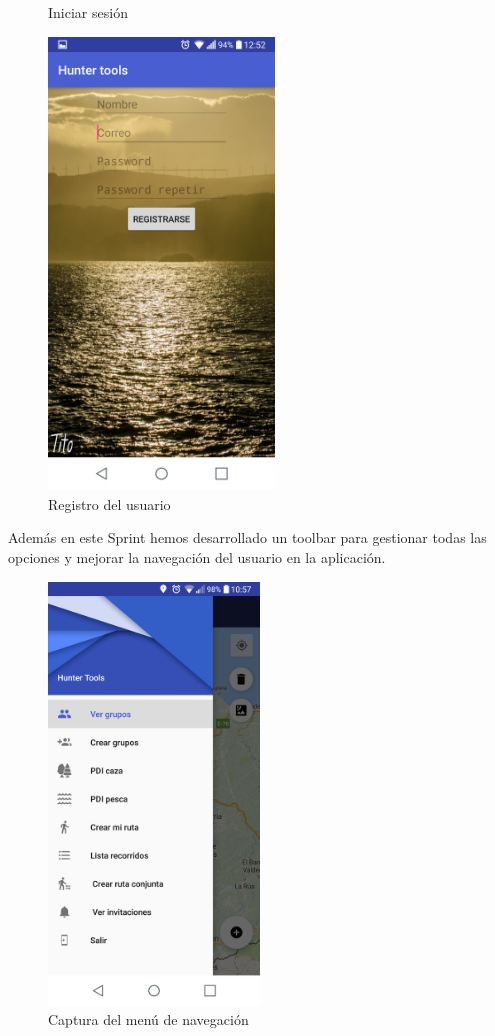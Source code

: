 \begin{figure}[htbp]
\begin{minipage}[b]{0.5\linewidth}
\caption{Iniciar sesión }
\label{fig:login}
\end{minipage}
\hspace{0.5cm} %
\begin{minipage}[b]{0.5\linewidth}
\centering
\includegraphics[width=6cm]{capturamovil/registro.png}

\caption{Registro del usuario }
\label{fig:registro}
\end{minipage}
\end{figure}
Además en este Sprint hemos desarrollado un toolbar para gestionar todas las opciones y mejorar la navegación del usuario en la aplicación.
\begin{figure}[H]
		\centering
		\includegraphics[width=0.5\textwidth] {capturamovil/opciones}
		\caption{Captura del menú de navegación}
	\end{figure}

